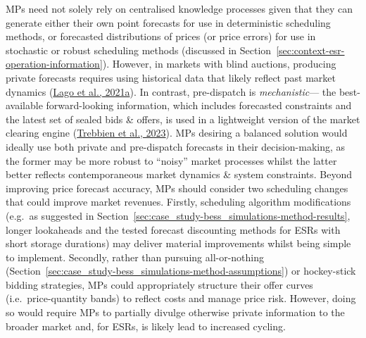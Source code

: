 \documentclass[12pt,a4paper,]{report}
\begin{document}
MPs need not solely rely on centralised knowledge processes given that
they can generate either their own point forecasts for use in
deterministic scheduling methods, or forecasted distributions of prices
(or price errors) for use in stochastic or robust scheduling methods
(discussed in Section~\ref{sec:context-esr-operation-information}).
However, in markets with blind auctions, producing private forecasts
requires using historical data that likely reflect past market dynamics
(\protect\hyperlink{ref-lagoForecastingDayaheadElectricity2021}{Lago et
al., 2021a}). In contrast, pre-dispatch is \emph{mechanistic}--- the
best-available forward-looking information, which includes forecasted
constraints and the latest set of sealed bids \& offers, is used in a
lightweight version of the market clearing engine
(\protect\hyperlink{ref-trebbienUnderstandingElectricityPrices2023}{Trebbien
et al., 2023}). MPs desiring a balanced solution would ideally use both
private and pre-dispatch forecasts in their decision-making, as the
former may be more robust to ``noisy'' market processes whilst the
latter better reflects contemporaneous market dynamics \& system
constraints. Beyond improving price forecast accuracy, MPs should
consider two scheduling changes that could improve market revenues.
Firstly, scheduling algorithm modifications (e.g.~as suggested in
Section~\ref{sec:case_study-bess_simulations-method-results}, longer
lookaheads and the tested forecast discounting methods for ESRs with
short storage durations) may deliver material improvements whilst being
simple to implement. Secondly, rather than pursuing all-or-nothing
(Section~\ref{sec:case_study-bess_simulations-method-assumptions}) or
hockey-stick bidding strategies, MPs could appropriately structure their
offer curves (i.e.~price-quantity bands) to reflect costs and manage
price risk. However, doing so would require MPs to partially divulge
otherwise private information to the broader market and, for ESRs, is
likely lead to increased cycling.
\end{document}
